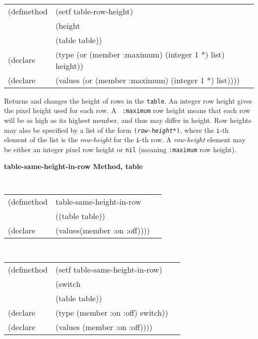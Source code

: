 {\samepage
\begin{flushright} \parbox[t]{6.125in}{
\tt
\begin{tabular}{lll}
\raggedright
(defmethod & (setf table-row-height) & \\
         & (height \\
         & (table table)) \\
(declare &(type (or (member :maximum) (integer 1 *) list)  height))\\
(declare & (values (or (member :maximum) (integer 1 *) list))))
\end{tabular}
\rm
}
\end{flushright}}


\begin{flushright} \parbox[t]{6.125in}{
Returns and changes the height of rows in the {\tt table}. An integer row
height gives the pixel height used for each row.  A {\tt
:maximum} row height means that each row will be as high as its highest member,
and thus may differ in height. Row heights may also be specified by a
list of the form {\tt ({\em row-height*})}, where the {\tt i}-th element of
the list is the {\em row-height} for the {\tt i}-th row. A {\em
row-height} element may be either an integer pixel row height or {\tt nil}
(meaning {\tt :maximum} row height).

}\end{flushright}

	  
{\samepage
{\large {\bf table-same-height-in-row \hfill Method, table}}
\begin{flushright} \parbox[t]{6.125in}{
\tt
\begin{tabular}{lll}
\raggedright
(defmethod & table-same-height-in-row & \\
& ((table  table)) \\
(declare & (values(member :on :off))))
\end{tabular}
\rm

}\end{flushright}}

{\samepage
\begin{flushright} \parbox[t]{6.125in}{
\tt
\begin{tabular}{lll}
\raggedright
(defmethod & (setf table-same-height-in-row) & \\
         & (switch \\
         & (table table)) \\
(declare &(type (member :on :off)  switch))\\
(declare & (values (member :on :off))))
\end{tabular}
\rm
}
\end{flushright}}


